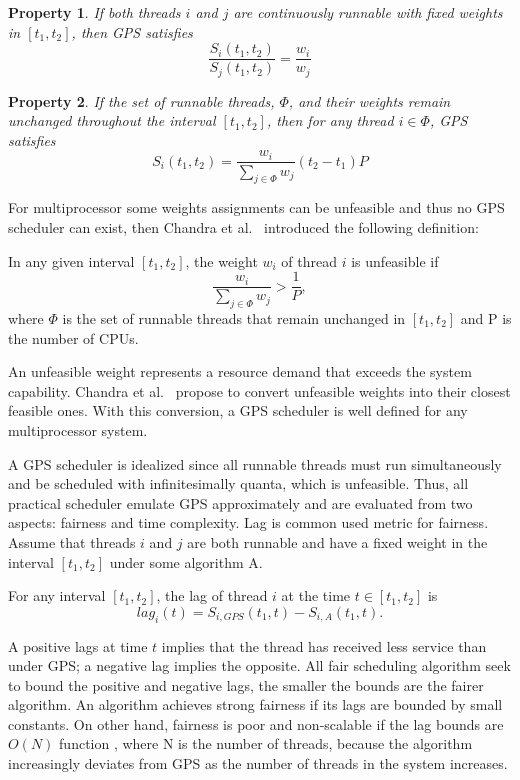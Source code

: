 \newtheorem{gps-props}{Property}
\begin{gps-props}
If both threads $i$ and $j$ are continuously runnable with fixed weights in $[t_1, t_2]$, then GPS satisfies 
$$\frac{S_i(t_1, t_2)}{S_j(t_1, t_2)} = \frac{w_i}{w_j}$$
\end{gps-props}

\begin{gps-props}
If the set of runnable threads, $\Phi$, and their weights remain unchanged throughout  the interval $[t_1, t_2]$, then for any thread $i \in \Phi$, GPS satisfies
$$S_i(t_1, t_2) = \frac{w_i}{\sum_{j \in \Phi} w_j}(t_2 - t_1)P$$
\end{gps-props}

For multiprocessor some weights assignments can be unfeasible  and thus no GPS scheduler can exist, then Chandra et al.~\cite{chandra00} introduced the following definition:

\begin{gps-model}
In any given interval $[t_1, t_2]$, the weight $w_i$ of thread $i$ is unfeasible if
$$\frac{w_i}{\sum_{j \in \Phi}w_j} > \frac{1}{P},$$
where $\Phi$ is the set of runnable threads that remain unchanged in $[t_1, t_2]$ and P is the number of CPUs.
\end{gps-model} 

An unfeasible weight represents a resource demand that exceeds the system capability. Chandra et al.~\cite{chandra00} propose to convert unfeasible weights into their closest feasible ones. With this conversion, a GPS scheduler is well defined for any multiprocessor system.

A GPS scheduler is idealized since all runnable threads must run simultaneously and be scheduled with infinitesimally quanta, which is unfeasible. Thus, all practical scheduler emulate GPS approximately and are evaluated from two aspects: fairness and time complexity. Lag is common used metric for fairness. Assume that threads $i$ and $j$ are both runnable and have a fixed weight in the interval $[t_1, t_2]$ under some algorithm A.

\begin{gps-model}
For any interval $[t_1, t_2]$, the lag of thread $i$ at the time $t \in [t_1, t_2]$ is
$$lag_i(t) = S_{i, GPS}(t_1, t) - S_{i, A}(t_1, t).$$
\end{gps-model}

A positive lags at time $t$ implies that the thread has received less service than under GPS; a negative lag implies the opposite. All fair scheduling algorithm seek to bound the positive and negative lags, the smaller the bounds are the fairer algorithm. An algorithm achieves strong fairness if its lags are bounded by small constants. On other hand, fairness is poor and non-scalable if the lag bounds are $O(N)$ function , where N is the number of threads, because the algorithm  increasingly deviates from GPS as the number of threads in the system increases.

